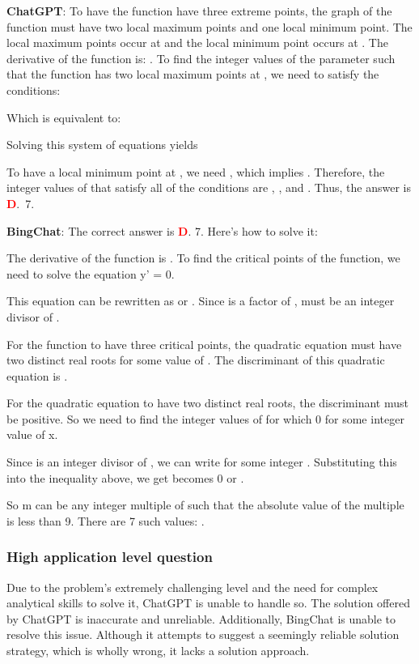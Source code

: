 \documentclass{article}
\begin{document}
{\begin{mdframed}[linewidth=1pt,linecolor=red]
		\textbf{ChatGPT}: To have the function  have three extreme points, the graph of the function must have two local maximum points and one local minimum point. The local maximum points occur at  and the local minimum point occurs at . The derivative of the function is: . To find the integer values of the parameter  such that the function has two local maximum points at , we need to satisfy the conditions: 
		 
		Which is equivalent to:
		 
		Solving this system of equations yields
		
		To have a local minimum point at , we need , which implies . Therefore, the integer values of  that satisfy all of the conditions are , , and . Thus, the answer is \textcolor{red}{\textbf{D}}.~7.
		
		\textbf{BingChat}: The correct answer is \textcolor{red}{\textbf{D}}. 7. Here’s how to solve it:
		
		The derivative of the function  is . To find the critical points of the function, we need to solve the equation y’ = 0.
		
		This equation can be rewritten as  or . Since  is a factor of ,  must be an integer divisor of .
		
		For the function to have three critical points, the quadratic equation  must have two distinct real roots for some value of . The discriminant of this quadratic equation is .
		
		For the quadratic equation to have two distinct real roots, the discriminant must be positive. So we need to find the integer values of  for which  0 for some integer value of x.
		
		Since  is an integer divisor of , we can write  for some integer . Substituting this into the inequality above, we get  becomes  0 or .
		
		So m can be any integer multiple of  such that the absolute value of the multiple is less than 9. There are 7 such values: .
		
	\end{mdframed}
	
	\subsubsection{High application level question}
	\label{VNHSGE_Math_H}
	
	Due to the problem's extremely challenging level and the need for complex analytical skills to solve it, ChatGPT is unable to handle so. The solution offered by ChatGPT is inaccurate and unreliable. Additionally, BingChat is unable to resolve this issue. Although it attempts to suggest a seemingly reliable solution strategy, which is wholly wrong, it lacks a solution approach.
	
}
\end{document}
